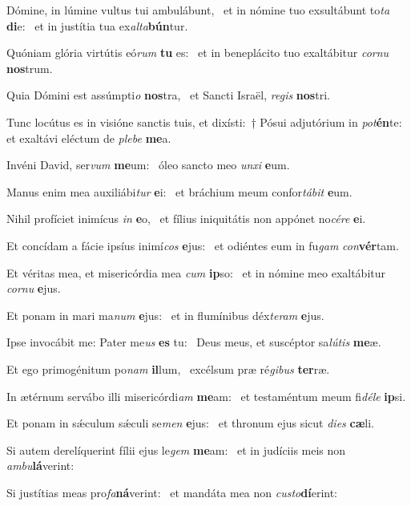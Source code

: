 \item Dómine, in lúmine vultus tui ambulábunt,~\pscross{} et in nómine tuo exsultábunt to\textit{ta} \textbf{di}e:~\psstar{} et in justítia tua ex\textit{alta}\textbf{bún}tur.
\item Quóniam glória virtútis eó\textit{rum} \textbf{tu} es:~\psstar{} et in beneplácito tuo exaltábitur \textit{cornu} \textbf{nos}trum.
\item Quia Dómini est assúmpti\textit{o} \textbf{nos}tra,~\psstar{} et Sancti Israël, \textit{regis} \textbf{nos}tri.
\item Tunc locútus es in visióne sanctis tuis, et dixísti:~† Pósui adjutórium in \textit{pot}\textbf{én}te:~\psstar{} et exaltávi eléctum de \textit{plebe} \textbf{me}a.
\item Invéni David, ser\textit{vum} \textbf{me}um:~\psstar{} óleo sancto meo \textit{unxi} \textbf{e}um.
\item Manus enim mea auxiliábi\textit{tur} \textbf{e}i:~\psstar{} et bráchium meum confor\textit{tábit} \textbf{e}um.
\item Nihil profíciet inimícus \textit{in} \textbf{e}o,~\psstar{} et fílius iniquitátis non appónet no\textit{cére} \textbf{e}i.
\item Et concídam a fácie ipsíus inimí\textit{cos} \textbf{e}jus:~\psstar{} et odiéntes eum in fu\textit{gam} \textit{con}\textbf{vér}tam.
\item Et véritas mea, et misericórdia mea \textit{cum} \textbf{ip}so:~\psstar{} et in nómine meo exaltábitur \textit{cornu} \textbf{e}jus.
\item Et ponam in mari ma\textit{num} \textbf{e}jus:~\psstar{} et in flumínibus déx\textit{teram} \textbf{e}jus.
\item Ipse invocábit me: Pater me\textit{us} \textbf{es} tu:~\psstar{} Deus meus, et suscéptor sa\textit{lútis} \textbf{me}æ.
\item Et ego primogénitum po\textit{nam} \textbf{il}lum,~\psstar{} excélsum præ ré\textit{gibus} \textbf{ter}ræ.
\item In ætérnum servábo illi misericórdi\textit{am} \textbf{me}am:~\psstar{} et testaméntum meum fi\textit{déle} \textbf{ip}si.
\item Et ponam in sǽculum sǽculi se\textit{men} \textbf{e}jus:~\psstar{} et thronum ejus sicut \textit{dies} \textbf{cæ}li.
\item Si autem derelíquerint fílii ejus le\textit{gem} \textbf{me}am:~\psstar{} et in judíciis meis non \textit{ambu}\textbf{lá}verint:
\item Si justítias meas pro\textit{fa}\textbf{ná}ve\-rint:~\psstar{} et mandáta mea non \textit{custo}\textbf{dí}erint:

